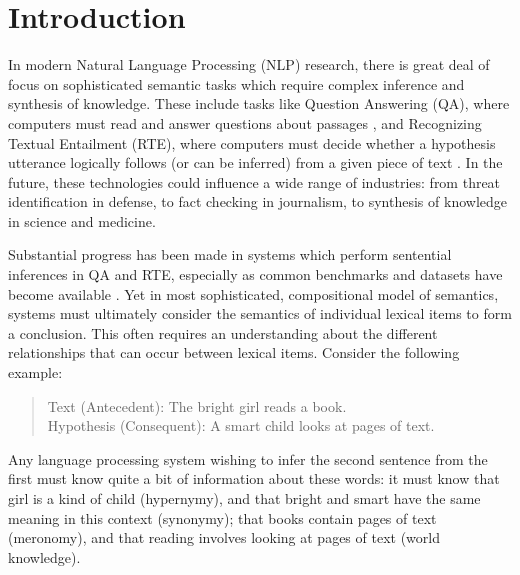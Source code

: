 \chapter{Introduction}
\label{ch:intro}

In modern Natural Language Processing (NLP) research, there is great deal of
focus on sophisticated semantic tasks which require complex inference and
synthesis of knowledge. These include tasks like Question Answering (QA), where
computers must read and answer questions about passages
\cite{hirschman:2001:nle,allam:2012:ijrris,gupta:2012:ijca}, and Recognizing Textual Entailment
(RTE), where computers must decide whether a hypothesis utterance logically
follows (or can be inferred) from a given piece of text
\cite{dagan:2006:mlc,marelli:2014:semeval,bowman:2015:emnlp}. In the future,
these technologies could influence a wide range of industries: from threat
identification in defense, to fact checking in journalism, to
synthesis of knowledge in science and medicine.

Substantial progress has been made in systems which perform
sentential inferences in QA and RTE, especially as common benchmarks
and datasets have become available
\cite{dagan:2006:mlc,giampiccolo:2007:pascal,bentivogli:2009:tac,marelli:2014:semeval,bowman:2015:emnlp}.
Yet in most sophisticated, compositional model of semantics, systems must
ultimately consider the semantics of individual lexical items to form a
conclusion. This often requires an understanding about the different
relationships that can occur between lexical items. Consider the following
example:
\begin{quote}
  \label{ex:rte}
  Text (Antecedent): The bright girl reads a book.\\
  Hypothesis (Consequent): A smart child looks at pages of text.
\end{quote}
Any language processing system wishing to infer the second sentence from the
first must know quite a bit of information about these words: it must know that
girl is a kind of child (hypernymy), and that bright and smart have the same
meaning in this context (synonymy); that books contain pages of text
(meronomy), and that reading involves looking at pages of text (world knowledge).

